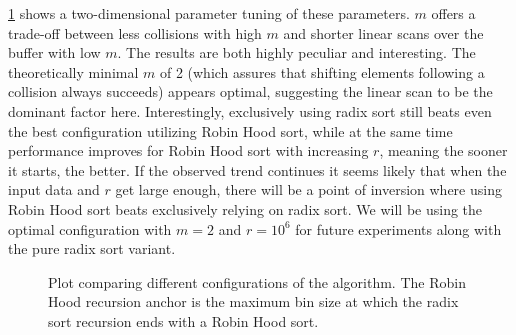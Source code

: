 \documentclass[a4paper,UKenglish,cleveref, autoref, thm-restate]{template/lipics-v2021}
\begin{document}
	\cref{fig:pt} shows a two-dimensional parameter tuning of these parameters.
	$m$ offers a trade-off between less collisions with high $m$ and shorter linear scans over the buffer with low $m$.
	The results are both highly peculiar and interesting.
	The theoretically minimal $m$ of 2 (which assures that shifting elements following a collision always succeeds) appears optimal, suggesting the linear scan to be the dominant factor here.
	Interestingly, exclusively using radix sort still beats even the best configuration utilizing Robin Hood sort, while at the same time performance improves for Robin Hood sort with increasing $r$, meaning the sooner it starts, the better.
	If the observed trend continues it seems likely that when the input data and $r$ get large enough, there will be a point of inversion where using Robin Hood sort beats exclusively relying on radix sort.
	We will be using the optimal configuration with $m=2$ and $r=10^6$ for future experiments along with the pure radix sort variant.

	\begin{figure}[h]
		\centering
		\caption{Plot comparing different configurations of the algorithm. The Robin Hood recursion anchor is the maximum bin size at which the radix sort recursion ends with a Robin Hood sort.}
		\label{fig:pt}
	\end{figure}
	
\end{document}

